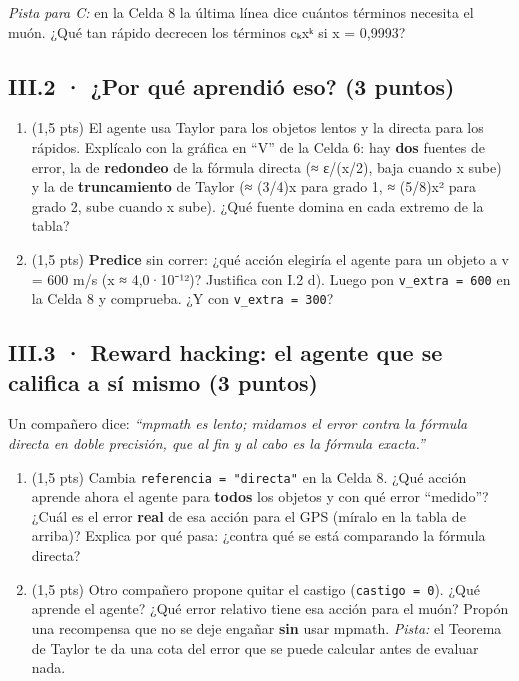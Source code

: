 \emph{Pista para C:} en la Celda 8 la última línea dice cuántos términos necesita el muón. ¿Qué tan rápido decrecen los términos cₖxᵏ si x = 0,9993?

\subsection{III.2 · ¿Por qué aprendió eso? (3 puntos)}

\begin{enumerate}
\def\labelenumi{\alph{enumi})}
\item
  (1,5 pts) El agente usa Taylor para los objetos lentos y la directa para los rápidos. Explícalo con la gráfica en ``V'' de la Celda 6: hay \textbf{dos} fuentes de error, la de \textbf{redondeo} de la fórmula directa (≈ ε/(x/2), baja cuando x sube) y la de \textbf{truncamiento} de Taylor (≈ (3/4)x para grado 1, ≈ (5/8)x² para grado 2, sube cuando x sube). ¿Qué fuente domina en cada extremo de la tabla?
\item
  (1,5 pts) \textbf{Predice} sin correr: ¿qué acción elegiría el agente para un objeto a v = 600 m/s (x ≈ 4,0·10⁻¹²)? Justifica con I.2 d). Luego pon \texttt{v\_extra\ =\ 600} en la Celda 8 y comprueba. ¿Y con \texttt{v\_extra\ =\ 300}?
\end{enumerate}

\subsection{III.3 · Reward hacking: el agente que se califica a sí mismo (3 puntos)}

Un compañero dice: \emph{``mpmath es lento; midamos el error contra la fórmula directa en doble precisión, que al fin y al cabo es la fórmula exacta.''}

\begin{enumerate}
\def\labelenumi{\alph{enumi})}
\item
  (1,5 pts) Cambia \texttt{referencia\ =\ "directa"} en la Celda 8. ¿Qué acción aprende ahora el agente para \textbf{todos} los objetos y con qué error ``medido''? ¿Cuál es el error \textbf{real} de esa acción para el GPS (míralo en la tabla de arriba)? Explica por qué pasa: ¿contra qué se está comparando la fórmula directa?
\item
  (1,5 pts) Otro compañero propone quitar el castigo (\texttt{castigo\ =\ 0}). ¿Qué aprende el agente? ¿Qué error relativo tiene esa acción para el muón? Propón una recompensa que no se deje engañar \textbf{sin} usar mpmath. \emph{Pista:} el Teorema de Taylor te da una cota del error que se puede calcular antes de evaluar nada.
\end{enumerate}

